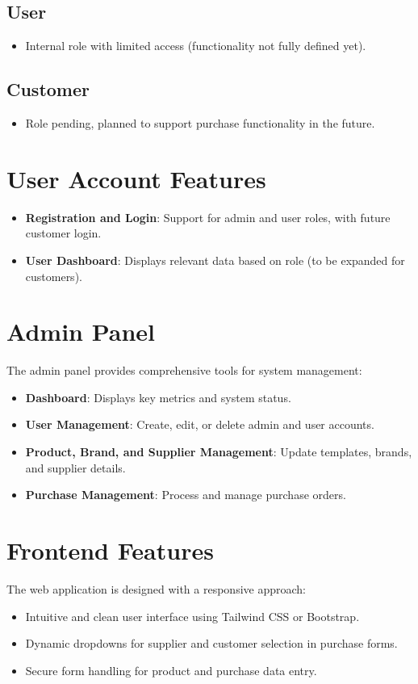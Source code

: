 \documentclass[a4paper,12pt]{article}
\begin{document}
\subsection{User}
\begin{itemize}
    \item Internal role with limited access (functionality not fully defined yet).
\end{itemize}

\subsection{Customer}
\begin{itemize}
    \item Role pending, planned to support purchase functionality in the future.
\end{itemize}

\section{User Account Features}
\begin{itemize}
    \item \textbf{Registration and Login}: Support for admin and user roles, with future customer login.
    \item \textbf{User Dashboard}: Displays relevant data based on role (to be expanded for customers).
\end{itemize}

\section{Admin Panel}
The admin panel provides comprehensive tools for system management:
\begin{itemize}
    \item \textbf{Dashboard}: Displays key metrics and system status.
    \item \textbf{User Management}: Create, edit, or delete admin and user accounts.
    \item \textbf{Product, Brand, and Supplier Management}: Update templates, brands, and supplier details.
    \item \textbf{Purchase Management}: Process and manage purchase orders.
\end{itemize}

\section{Frontend Features}
The web application is designed with a responsive approach:
\begin{itemize}
    \item Intuitive and clean user interface using Tailwind CSS or Bootstrap.
    \item Dynamic dropdowns for supplier and customer selection in purchase forms.
    \item Secure form handling for product and purchase data entry.
\end{itemize}
\end{document}

